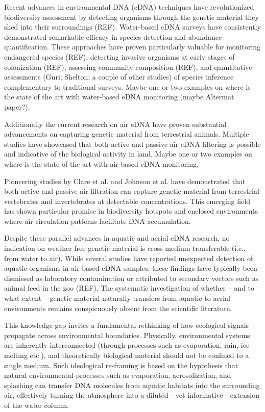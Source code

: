 \documentclass{article}
\begin{document}
Recent advances in environmental DNA (eDNA) techniques have revolutionized biodiversity assessment by detecting organisms through the genetic material they shed into their surroundings (REF). Water-based eDNA surveys have consistently demonstrated remarkable efficacy in species detection and abundance quantification. These approaches have proven particularly valuable for monitoring endangered species (REF), detecting invasive organisms at early stages of colonization (REF), assessing community composition (REF), and quantitative assessments (Guri; Shelton; a couple of other studies) of species inference complementary to traditional surveys. Maybe one or two examples on where is the state of the art with water-based eDNA monitoring (maybe Altermat paper?).

Additionally the current research on air eDNA have proven substantial advancements on capturing genetic material from terrestrial animals. Multiple studies have showcased that both active and passive air eDNA filtering is possible and indicative of the biological activity in land. Maybe one or two examples on where is the state of the art with air-based eDNA monitoring.

Pioneering studies by Clare et al. and Johnson et al. have demonstrated that both active and passive air filtration can capture genetic material from terrestrial vertebrates and invertebrates at detectable concentrations. This emerging field has shown particular promise in biodiversity hotspots and enclosed environments where air circulation patterns facilitate DNA accumulation.

Despite these parallel advances in aquatic and aerial eDNA research, no indication on weather free-genetic material is cross-medium transferable (i.e., from water to air). While several studies have reported unexpected detection of aquatic organisms in air-based eDNA samples, these findings have typically been dismissed as laboratory contamination or attributed to secondary vectors such as animal feed in the zoo (REF). The systematic investigation of whether -- and to what extent -- genetic material naturally transfers from aquatic to aerial environments remains conspicuously absent from the scientific literature.

This knowledge gap invites a fundamental rethinking of how ecological signals propagate across environmental boundaries. Physically, environmental systems are inherently interconnected (through processes such as evaporation, rain, ice melting etc.), and theoretically biological material should not be confined to a single medium. Such ideological re-framing is based on the hypothesis that natural environmental processes such as evaporation, aerosolization, and splashing can transfer DNA molecules from aquatic habitats into the surrounding air, effectively turning the atmosphere into a diluted - yet informative - extension of the water column. 
\end{document}
